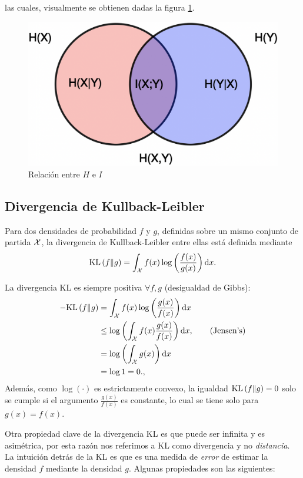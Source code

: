 las cuales, visualmente se obtienen dadas la figura \ref{fig:relationentropy}.

\begin{figure}[ht]
    \centering
    \includegraphics[width=0.7\columnwidth]{img/relationentropy.png}
    \caption{Relación entre $H$ e $I$}
    \label{fig:relationentropy}
\end{figure}

\subsection{Divergencia de Kullback-Leibler}

\begin{definition}
Para dos densidades de probabilidad $f$ y $g$, definidas sobre un mismo conjunto de partida ${\mathcal X}$, la divergencia de Kullback-Leibler entre ellas está definida mediante 
\begin{equation}
	\text{KL}\left(f\middle\|g\right) = \int_{\mathcal X} f(x)\log\left(\frac{f(x)}{g(x)}\right){\text{d}x}.
\end{equation}
\end{definition}

\begin{remark} La divergencia KL es siempre positiva $\forall f,g$ (desigualdad de Gibbs):
\begin{align*}
 	-\text{KL}\left(f\middle\|g\right)  &= \int_{\mathcal X} f(x)\log\left(\frac{g(x)}{f(x)}\right){\text{d}x}\\
 				&\leq \log\left(\int_{\mathcal X} f(x)\frac{g(x)}{f(x)}\right){\text{d}x}, \quad\quad \text{(Jensen's)}\\
 				&= \log\left(\int_{\mathcal X} g(x)\right){\text{d}x}\\
 				&=\log 1=0.,	
 \end{align*} 
Además, como $\log(\cdot)$ es estrictamente convexo, la igualdad $\text{KL}\left(f\middle\|g\right)=0$ solo se cumple si el argumento $\frac{g(x)}{f(x)}$ es constante, lo cual se tiene solo para ${g(x)} = {f(x)}$.
\end{remark}

Otra propiedad clave de la divergencia KL es que puede ser infinita y es asimétrica, por esta razón nos referimos a KL como divergencia y no \emph{distancia}. La intuición detrás de la KL es que es una medida de \textit{error} de estimar la densidad $f$ mediante la densidad $g$. Algunas propiedades son las siguientes:

